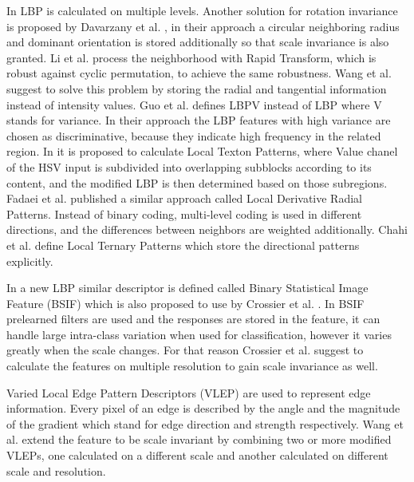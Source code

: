 \documentclass[draft,final]{vutinfth} %
\begin{document}
In \cite{khellah2011texture} LBP is calculated on multiple levels.
Another solution for rotation invariance is proposed by Davarzany et al. \cite{davarzani2015scale}, in their approach a circular neighboring radius and dominant orientation is stored additionally so that scale invariance is also granted.
Li et al. \cite{li2014rapid} process the neighborhood with Rapid Transform, which is robust against cyclic permutation, to achieve the same robustness.
Wang et al. \cite{wang2017local} suggest to solve this problem by storing the radial and tangential information instead of intensity values.
Guo et al. \cite{guo2010rotation} defines LBPV instead of LBP where V stands for variance. 
In their approach the LBP features with high variance are chosen as discriminative, because they indicate high frequency in the related region.
In \cite{bala2016local} it is proposed to calculate Local Texton Patterns, where Value chanel of the HSV input is subdivided into overlapping subblocks according to its content, and the modified LBP is then determined based on those subregions.
Fadaei et al. \cite{fadaei2017local} published a similar approach called Local Derivative Radial Patterns.
Instead of binary coding, multi-level coding is used in different directions, and the differences between neighbors are weighted additionally.
Chahi et al. \cite{chahi2018local} define Local Ternary Patterns which store the directional patterns explicitly.
\par
In \cite{kannala2012bsif} a new LBP similar descriptor is defined called Binary Statistical Image Feature (BSIF) which is also proposed to use by Crossier et al. \cite{crosier2010using}.
In BSIF prelearned filters are used and the responses are stored in the feature, it can handle large intra-class variation when used for classification, however it varies greatly when the scale changes.
For that reason Crossier et al. \cite{crosier2010using} suggest to calculate the features on multiple resolution to gain scale invariance as well.
\par
Varied Local Edge Pattern Descriptors (VLEP) \cite{yan2016edge} are used to represent edge information.
Every pixel of an edge is described by the angle and the magnitude of the gradient which stand for edge direction and strength respectively.
Wang et al. \cite{wang2018using} extend the feature to be scale invariant by combining two or more modified VLEPs, one calculated on a different scale and another calculated on different scale and resolution.
\end{document}
